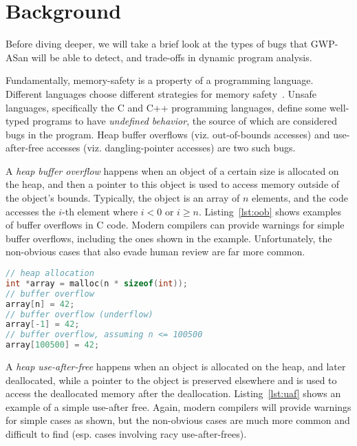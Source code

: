 \section{Background}
\label{sec:background}

Before diving deeper, we will take a brief look at the types of bugs that
GWP-ASan will be able to detect, and trade-offs in dynamic program analysis.

 Fundamentally, memory-safety is a property
of a programming language. Different languages choose different strategies for
memory safety~\cite{SzekeresPWS2013}. Unsafe languages, specifically the C and
C++ programming languages, define some well-typed programs to have
\emph{undefined behavior}, the source of which are considered bugs in the
program. Heap buffer overflows (viz. out-of-bounds accesses) and use-after-free
accesses (viz. dangling-pointer accesses) are two such bugs.

A \emph{heap buffer overflow} happens when an object of a certain size is
allocated on the heap, and then a pointer to this object is used to access
memory outside of the object's bounds. Typically, the object is an array of $n$
elements, and the code accesses the $i$-th element where $i < 0$ or $i \geq n$.
Listing~\ref{lst:oob} shows examples of buffer overflows in C code. Modern
compilers can provide warnings for simple buffer overflows, including the ones
shown in the example. Unfortunately, the non-obvious cases that also evade
human review are far more common.

\vspace{-1em}
\begin{lstlisting}[language=C, frame=single, xleftmargin=0.5em,
  xrightmargin=0.5em, caption=Buffer overflow examples., label=lst:oob]
// heap allocation
int *array = malloc(n * sizeof(int));
// buffer overflow
array[n] = 42;
// buffer overflow (underflow)
array[-1] = 42;
// buffer overflow, assuming n <= 100500
array[100500] = 42;
\end{lstlisting}

A \emph{heap use-after-free} happens when an object is allocated on the heap,
and later deallocated, while a pointer to the object is preserved elsewhere and
is used to access the deallocated memory after the deallocation.
Listing~\ref{lst:uaf} shows an example of a simple use-after free. Again,
modern compilers will provide warnings for simple cases as shown, but the
non-obvious cases are much more common and difficult to find (esp. cases
involving racy use-after-frees).

